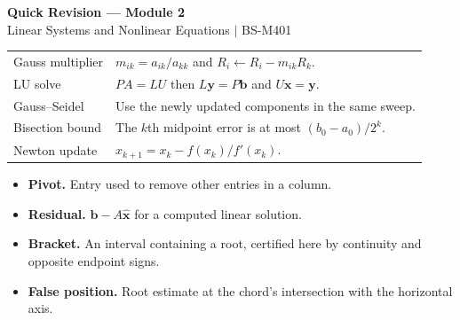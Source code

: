\documentclass[12pt,a4paper]{article}
\renewcommand{\arraystretch}{1.45}
\begin{document}
\newpage
\begin{center}
  {\large\bfseries\color{myred} Quick Revision --- Module 2}\\[3pt]
  {\small\color{mydark} Linear Systems and Nonlinear Equations $|$ BS-M401}
\end{center}
\noindent{\color{myred}\rule{\linewidth}{1.2pt}}\par\vspace{4pt}

\begin{tcolorbox}[formulabox, title={Key Concepts at a Glance}]
\renewcommand{\arraystretch}{1.35}
\noindent\begin{tabularx}{\linewidth}{B{4.5cm}Y}
Gauss multiplier & $m_{ik}=a_{ik}/a_{kk}$ and $R_i\leftarrow R_i-m_{ik}R_k$. \\[3pt]
LU solve & $PA=LU$ then $L\mathbf{y}=P\mathbf{b}$ and $U\mathbf{x}=\mathbf{y}$. \\[3pt]
Gauss--Seidel & Use the newly updated components in the same sweep. \\[3pt]
Bisection bound & The $k$th midpoint error is at most $(b_0-a_0)/2^k$. \\[3pt]
Newton update & $x_{k+1}=x_k-f(x_k)/f'(x_k)$. \\[3pt]
\end{tabularx}\par
\end{tcolorbox}

\begin{tcolorbox}[defbox, title={One-Line Definitions}]
\begin{itemize}[leftmargin=*, itemsep=3pt, topsep=4pt]
  \item \textbf{Pivot.} Entry used to remove other entries in a column.
  \item \textbf{Residual.} $\mathbf{b}-A\hat{\mathbf{x}}$ for a computed linear solution.
  \item \textbf{Bracket.} An interval containing a root, certified here by continuity and opposite endpoint signs.
  \item \textbf{False position.} Root estimate at the chord's intersection with the horizontal axis.
\end{itemize}
\end{tcolorbox}
\end{document}
